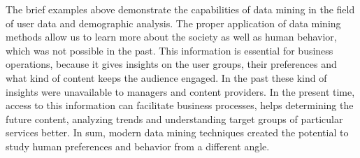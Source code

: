The brief examples above demonstrate the capabilities of data mining in the field of user data and demographic analysis. The proper application of data mining methods allow us to learn more about the society as well as human behavior, which was not possible in the past. This information is essential for business operations, because it gives insights on the user groups, their preferences and what kind of content keeps the audience engaged. In the past these kind of insights were unavailable to managers and content providers. In the present time, access to this information can facilitate business processes, helps determining the future content, analyzing trends and understanding target groups of particular services better. In sum, modern data mining techniques created the potential to study human preferences and behavior from a different angle. 